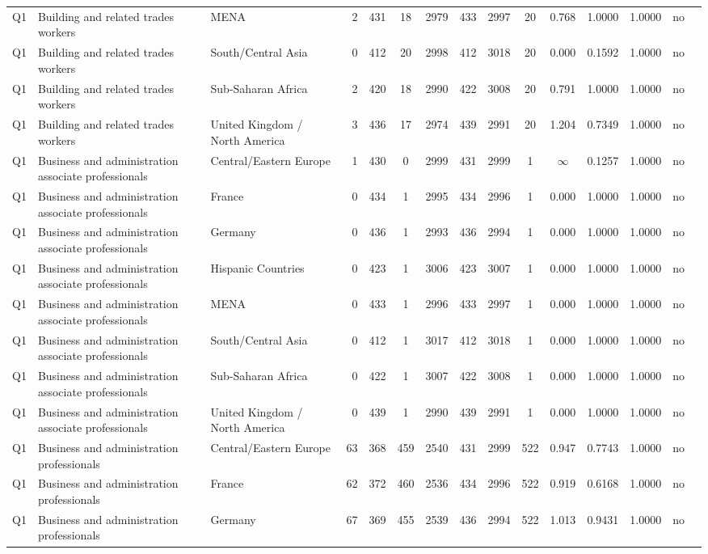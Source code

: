 \begin{longtable}{lllrcccccccccll}
Q1 & Building and related trades workers & MENA & 2 & 431 & 18 & 2979 & 433 & 2997 & 20 & 0.768 & 1.0000 & 1.0000 & no \\
Q1 & Building and related trades workers & South/Central Asia & 0 & 412 & 20 & 2998 & 412 & 3018 & 20 & 0.000 & 0.1592 & 1.0000 & no \\
Q1 & Building and related trades workers & Sub-Saharan Africa & 2 & 420 & 18 & 2990 & 422 & 3008 & 20 & 0.791 & 1.0000 & 1.0000 & no \\
Q1 & Building and related trades workers & United Kingdom / North America & 3 & 436 & 17 & 2974 & 439 & 2991 & 20 & 1.204 & 0.7349 & 1.0000 & no \\
Q1 & Business and administration associate professionals & Central/Eastern Europe & 1 & 430 & 0 & 2999 & 431 & 2999 & 1 & $\infty$ & 0.1257 & 1.0000 & no \\
Q1 & Business and administration associate professionals & France & 0 & 434 & 1 & 2995 & 434 & 2996 & 1 & 0.000 & 1.0000 & 1.0000 & no \\
Q1 & Business and administration associate professionals & Germany & 0 & 436 & 1 & 2993 & 436 & 2994 & 1 & 0.000 & 1.0000 & 1.0000 & no \\
Q1 & Business and administration associate professionals & Hispanic Countries & 0 & 423 & 1 & 3006 & 423 & 3007 & 1 & 0.000 & 1.0000 & 1.0000 & no \\
Q1 & Business and administration associate professionals & MENA & 0 & 433 & 1 & 2996 & 433 & 2997 & 1 & 0.000 & 1.0000 & 1.0000 & no \\
Q1 & Business and administration associate professionals & South/Central Asia & 0 & 412 & 1 & 3017 & 412 & 3018 & 1 & 0.000 & 1.0000 & 1.0000 & no \\
Q1 & Business and administration associate professionals & Sub-Saharan Africa & 0 & 422 & 1 & 3007 & 422 & 3008 & 1 & 0.000 & 1.0000 & 1.0000 & no \\
Q1 & Business and administration associate professionals & United Kingdom / North America & 0 & 439 & 1 & 2990 & 439 & 2991 & 1 & 0.000 & 1.0000 & 1.0000 & no \\
Q1 & Business and administration professionals & Central/Eastern Europe & 63 & 368 & 459 & 2540 & 431 & 2999 & 522 & 0.947 & 0.7743 & 1.0000 & no \\
Q1 & Business and administration professionals & France & 62 & 372 & 460 & 2536 & 434 & 2996 & 522 & 0.919 & 0.6168 & 1.0000 & no \\
Q1 & Business and administration professionals & Germany & 67 & 369 & 455 & 2539 & 436 & 2994 & 522 & 1.013 & 0.9431 & 1.0000 & no \\

\end{longtable}
